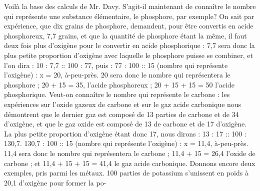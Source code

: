 Voilà la base des calculs de Mr. Davy. S'agit-il maintenant de connaître le nombre qui représente une substance élémentaire, le phosphore, par exemple? On sait par expérience, que dix grains de phosphore, demandent, pour être convertis en acide phosphoreux, 7,7 grains, et que la quantité de phosphore étant la même, il faut deux fois plus d'oxigène pour le convertir en acide\setcounter{page}{454} phosphorique : 7,7 sera donc la plus petite proportion d'oxigène avec laquelle le phosphore puisse se combiner, et l'on dira : 10 : 7,7 :: 100 : 77, puis : 77 : 100 :: 15 (nombre qui représente l'oxigène) : x = 20, à-peu-près. 20 sera donc le nombre qui représentera le phosphore ; 20 + 15 = 35, l'acide phosphoreux ; 20 + 15 + 15 = 50 l'acide phosphorique. Veut-on connaître le nombre qui représente le carbone : les expériences sur l'oxide gazeux de carbone et sur le gaz acide carbonique nous démontrent que le dernier gaz est composé de 13 parties de carbone et de 34 d'oxigène, et que le gaz oxide est composé de 13 de carbone et de 17 d'oxigène. La plus petite proportion d'oxigène étant donc 17, nous dirons : 13 : 17 :: 100 : 130,7. 130,7 : 100 :: 15 (nombre qui représente l'oxigène) : x = 11,4, à-peu-près. 11,4 sera donc le nombre qui représentera le carbone ; 11,4 + 15 = 26,4 l'oxide de carbone ; et 11,4 + 15 + 15 = 41,4 le gaz acide carbonique. Donnons encore deux exemples, pris parmi les métaux. 100 parties de potassium s'unissent en poids à 20,1 d'oxigène pour former la po-